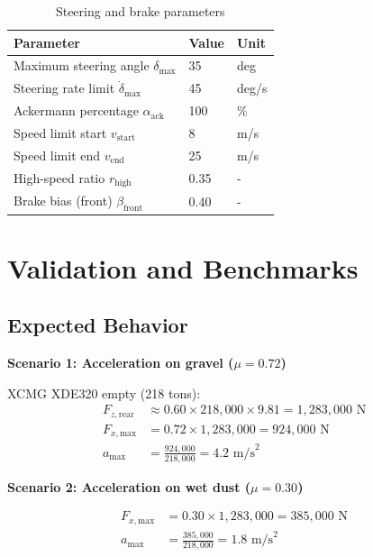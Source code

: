 \documentclass[11pt,a4paper]{article}
\begin{document}
\begin{table}[H]
\centering
\begin{tabular}{lll}
\toprule
\textbf{Parameter} & \textbf{Value} & \textbf{Unit} \\
\midrule
Maximum steering angle $\delta_{\max}$ & 35 & deg \\
Steering rate limit $\dot{\delta}_{\max}$ & 45 & deg/s \\
Ackermann percentage $\alpha_{\text{ack}}$ & 100 & \% \\
Speed limit start $v_{\text{start}}$ & 8 & m/s \\
Speed limit end $v_{\text{end}}$ & 25 & m/s \\
High-speed ratio $r_{\text{high}}$ & 0.35 & - \\
Brake bias (front) $\beta_{\text{front}}$ & 0.40 & - \\
\bottomrule
\end{tabular}
\caption{Steering and brake parameters}
\end{table}

\section{Validation and Benchmarks}

\subsection{Expected Behavior}

\textbf{Scenario 1: Acceleration on gravel ($\mu = 0.72$)}

XCMG XDE320 empty (218 tons):
\begin{align}
F_{z,\text{rear}} &\approx 0.60 \times 218{,}000 \times 9.81 = 1{,}283{,}000 \text{ N} \\
F_{x,\text{max}} &= 0.72 \times 1{,}283{,}000 = 924{,}000 \text{ N} \\
a_{\max} &= \frac{924{,}000}{218{,}000} = 4.2 \text{ m/s}^2
\end{align}

\textbf{Scenario 2: Acceleration on wet dust ($\mu = 0.30$)}

\begin{align}
F_{x,\text{max}} &= 0.30 \times 1{,}283{,}000 = 385{,}000 \text{ N} \\
a_{\max} &= \frac{385{,}000}{218{,}000} = 1.8 \text{ m/s}^2
\end{align}
\end{document}
